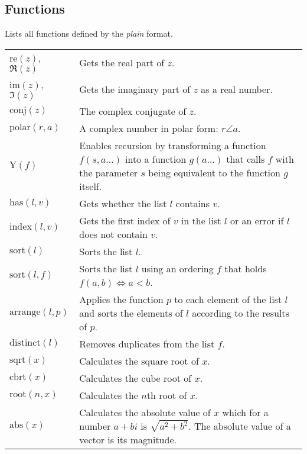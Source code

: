 \documentclass[10pt]{article}
\newcommand{\tabgap}{\vspace{3mm}\\}
\begin{document}
    \subsection{Functions}
    Lists all functions defined by the \textit{plain} format.
    \begin{longtable}{p{}p{}}
        $ \mathrm{re}(z) $, $ \Re(z) $             & Gets the real part of $ z $. \\
        $ \mathrm{im}(z) $, $ \Im(z) $             & Gets the imaginary part of $ z $ as a real number. \\
        $ \mathrm{conj}(z) $                       & The complex conjugate of $ z $. \\
        $ \mathrm{polar}(r, a) $                   & A complex number in polar form: $ r \angle a $. \tabgap
        $ \mathrm{Y}(f) $                          & Enables recursion by transforming a function $ f(s,a\dots) $ into a function $ g(a\dots) $ that calls $ f $ with the parameter $ s $ being equivalent to the function $ g $ itself. \tabgap
        $ \mathrm{has}(l, v) $                     & Gets whether the list $ l $ contains $ v $. \\
        $ \mathrm{index}(l, v) $                   & Gets the first index of $ v $ in the list $ l $ or an error if $ l $ does not contain $ v $. \\
        $ \mathrm{sort}(l) $                       & Sorts the list $ l $. \\
        $ \mathrm{sort}(l, f) $                    & Sorts the list $ l $ using an ordering $ f $ that holds $ f(a, b) \iff a < b $. \\
        $ \mathrm{arrange}(l, p) $                 & Applies the function $ p $ to each element of the list $ l $ and sorts the elements of $ l $ according to the results of $ p $. \\
        $ \mathrm{distinct}(l) $                   & Removes duplicates from the list $ f $. \tabgap
        $ \mathrm{sqrt}(x) $                       & Calculates the square root of $ x $. \\
        $ \mathrm{cbrt}(x) $                       & Calculates the cube root of $ x $. \\
        $ \mathrm{root}(n, x) $                    & Calculates the $ n $th root of $ x $. \tabgap
        $ \mathrm{abs}(x) $                        & Calculates the absolute value of $ x $ which for a number $ a + bi$ is $ \sqrt{a^2 + b^2} $. The absolute value of a vector is its magnitude. \\

\end{longtable}
\end{document}
